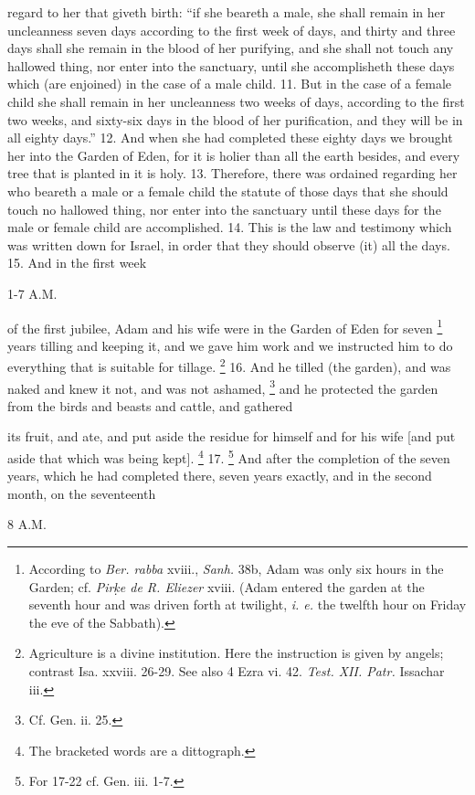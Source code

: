 regard to her that giveth birth: ``if she beareth a male, she shall remain in her uncleanness seven days according to the first week of days, and thirty and three days shall she remain in the blood of her purifying, and she shall not touch any hallowed thing, nor enter into the sanctuary, until she accomplisheth these days which (are enjoined) in the case of a male child. 11. But in the case of a female child she shall remain in her uncleanness two weeks of days, according to the first two weeks, and sixty-six days in the blood of her purification, and they will be in all eighty days.'' 12. And when she had completed these eighty days we brought her into the Garden of Eden, for it is holier than all the earth besides, and every tree that is planted in it is holy. 13. Therefore, there was ordained regarding her who beareth a male or a female child the statute of those days that she should touch no hallowed thing, nor enter into the sanctuary until these days for the male or female child are accomplished. 14. This is the law and testimony which was written down for Israel, in order that they should observe (it) all the days. 15. And in the first week

1-7 A.M.

of the first jubilee, Adam and his wife were in the Garden of Eden for seven \footnote{According to \emph{Ber. rabba} xviii., \emph{Sanh.} 38b, Adam was only six hours in the Garden; cf. \emph{Pir\d{k}e de R. Eliezer} xviii. (Adam entered the garden at the seventh hour and was driven forth at twilight, \emph{i. e.} the twelfth hour on Friday the eve of the Sabbath).} years tilling and keeping it, and we gave him work and we instructed him to do everything that is suitable for tillage. \footnote{Agriculture is a divine institution. Here the instruction is given by angels; contrast Isa. xxviii. 26-29. See also 4 Ezra vi. 42. \emph{Test. XII. Patr.} Issachar iii.} 16. And he tilled (the garden), and was naked and knew it not, and was not ashamed, \footnote{Cf. Gen. ii. 25.} and he protected the garden from the birds and beasts and cattle, and gathered

its fruit, and ate, and put aside the residue for himself and for his wife [and put aside that which was being kept]. \footnote{The bracketed words are a dittograph.} 17. \footnote{For 17-22 cf. Gen. iii. 1-7.} And after the completion of the seven years, which he had completed there, seven years exactly, and in the second month, on the seventeenth

8 A.M.

